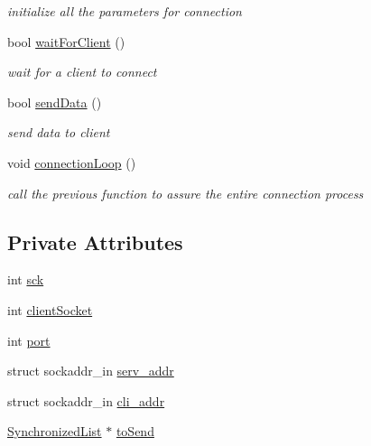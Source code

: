 \begin{DoxyCompactItemize}
\begin{DoxyCompactList}\small\item\em initialize all the parameters for connection \end{DoxyCompactList}\item 
bool \hyperlink{class_client_connection_sending_a8e5778b853d18c1a2e7f69bdeba85fce}{wait\-For\-Client} ()
\begin{DoxyCompactList}\small\item\em wait for a client to connect \end{DoxyCompactList}\item 
bool \hyperlink{class_client_connection_sending_afde57541ba6e1e52c2a77c79874ec4fc}{send\-Data} ()
\begin{DoxyCompactList}\small\item\em send data to client \end{DoxyCompactList}\item 
\hypertarget{class_client_connection_sending_aa5efbbd9b6650460a083453596fc8372}{void \hyperlink{class_client_connection_sending_aa5efbbd9b6650460a083453596fc8372}{connection\-Loop} ()}\label{class_client_connection_sending_aa5efbbd9b6650460a083453596fc8372}

\begin{DoxyCompactList}\small\item\em call the previous function to assure the entire connection process \end{DoxyCompactList}\end{DoxyCompactItemize}
\subsection*{Private Attributes}
\begin{DoxyCompactItemize}
\item 
int \hyperlink{class_client_connection_sending_a94e310425cce20a9ca04e2fc8f9edc4e}{sck}
\item 
int \hyperlink{class_client_connection_sending_a9d593090ef980ec12a906f05c7049f8a}{client\-Socket}
\item 
int \hyperlink{class_client_connection_sending_a46f6eb02dfb831e080e1af31c8cb6e19}{port}
\item 
struct sockaddr\-\_\-in \hyperlink{class_client_connection_sending_a46e362e1ad62b3bae76885281fe99a21}{serv\-\_\-addr}
\item 
struct sockaddr\-\_\-in \hyperlink{class_client_connection_sending_aec17aabe2499433189a97fae837c1cdd}{cli\-\_\-addr}
\item 
\hyperlink{class_synchronized_list}{Synchronized\-List} $\ast$ \hyperlink{class_client_connection_sending_a148ca07a2280bd684561fc2943d5fc9d}{to\-Send}
\end{DoxyCompactItemize}


